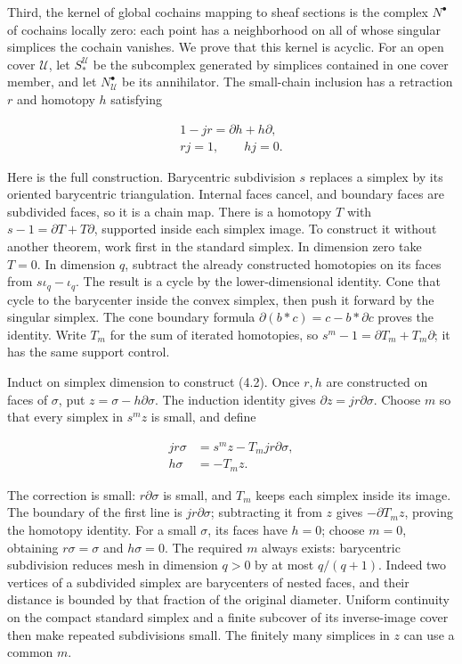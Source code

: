 \documentclass[
  english,
  11pt,
  a4paper,
]{article}
\begin{document}
Third, the kernel of global cochains mapping to sheaf sections is the
complex \(N^\bullet\) of cochains locally zero: each point has a
neighborhood on all of whose singular simplices the cochain vanishes. We
prove that this kernel is acyclic. For an open cover \(\mathcal U\), let
\(S_*^{\mathcal U}\) be the subcomplex generated by simplices contained
in one cover member, and let \(N_{\mathcal U}^\bullet\) be its
annihilator. The small-chain inclusion has a retraction \(r\) and
homotopy \(h\) satisfying

\[\begin{gathered}
1-jr=\partial h+h\partial,\\
rj=1,\qquad hj=0.
\end{gathered}
\tag{4.2}\]

Here is the full construction. Barycentric subdivision \(s\) replaces a
simplex by its oriented barycentric triangulation. Internal faces
cancel, and boundary faces are subdivided faces, so it is a chain map.
There is a homotopy \(T\) with \(s-1=\partial T+T\partial\), supported
inside each simplex image. To construct it without another theorem, work
first in the standard simplex. In dimension zero take \(T=0\). In
dimension \(q\), subtract the already constructed homotopies on its
faces from \(s\iota_q-\iota_q\). The result is a cycle by the
lower-dimensional identity. Cone that cycle to the barycenter inside the
convex simplex, then push it forward by the singular simplex. The cone
boundary formula \(\partial(b*c)=c-b*\partial c\) proves the identity.
Write \(T_m\) for the sum of iterated homotopies, so
\(s^m-1=\partial T_m+T_m\partial\); it has the same support control.

Induct on simplex dimension to construct (4.2). Once \(r,h\) are
constructed on faces of \(\sigma\), put \(z=\sigma-h\partial\sigma\).
The induction identity gives \(\partial z=jr\partial\sigma\). Choose
\(m\) so that every simplex in \(s^m z\) is small, and define

\[\begin{aligned}
jr\sigma&=s^mz-T_mjr\partial\sigma,\\
h\sigma&=-T_mz.
\end{aligned}
\tag{4.3}\]

The correction is small: \(r\partial\sigma\) is small, and \(T_m\) keeps
each simplex inside its image. The boundary of the first line is
\(jr\partial\sigma\); subtracting it from \(z\) gives
\(-\partial T_mz\), proving the homotopy identity. For a small
\(\sigma\), its faces have \(h=0\); choose \(m=0\), obtaining
\(r\sigma=\sigma\) and \(h\sigma=0\). The required \(m\) always exists:
barycentric subdivision reduces mesh in dimension \(q>0\) by at most
\(q/(q+1)\). Indeed two vertices of a subdivided simplex are barycenters
of nested faces, and their distance is bounded by that fraction of the
original diameter. Uniform continuity on the compact standard simplex
and a finite subcover of its inverse-image cover then make repeated
subdivisions small. The finitely many simplices in \(z\) can use a
common \(m\).
\end{document}

